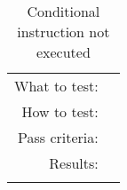 \begin{table}[H]
  \begin{tabular}{r | p{8cm}}
    \noalign{\smallskip}\hline\noalign{\smallskip}
    
    What to test:  & \\

    \noalign{\smallskip}\hline\noalign{\smallskip}

    How to test:   &  \\

    \noalign{\smallskip}\hline\noalign{\smallskip}

    Pass criteria: & \\

    \noalign{\smallskip}\hline\noalign{\smallskip}
    
    Results: &  \\
   \noalign{\smallskip}\hline\noalign{\smallskip}
  
  
  
  \end{tabular}
  \caption{Conditional instruction not executed}
  \label{testing:fitness:pipeline_test}
\end{table}